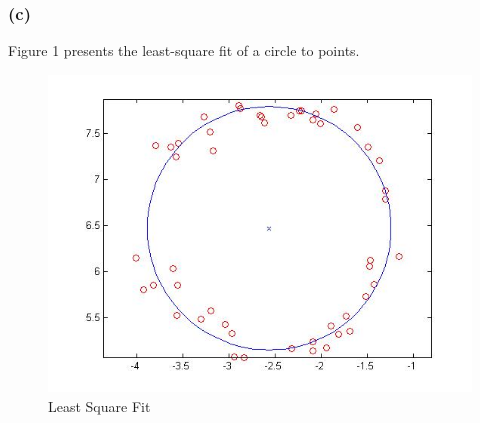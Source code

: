 \subsubsection*{(c)}
Figure 1 presents the least-square fit of a circle to points.
\begin{figure}[h]
	\centering
	\includegraphics[scale=0.5]{fit}
	\caption{Least Square Fit}
\end{figure}